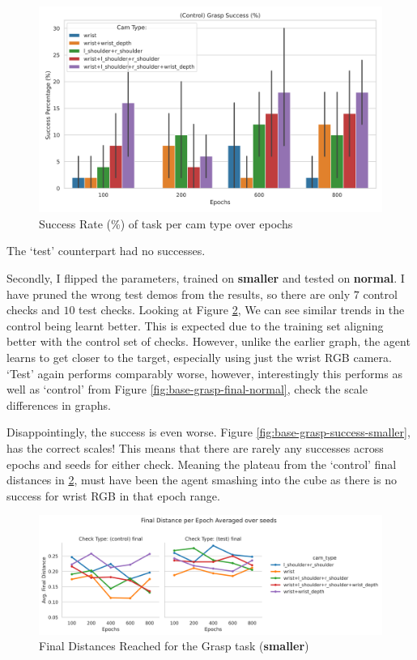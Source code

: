 \begin{figure}[htpb]
  \centering
  \includegraphics[width=0.6\linewidth]{assets/evaluation/baseline/base-grasp-control-success-cams-epochs.png}
  \caption{Success Rate (\%) of task per cam type over epochs}\label{fig:base-grasp-control-success-normal}
\end{figure}
The `test' counterpart had no successes.

Secondly, I flipped the parameters, trained on \textbf{smaller} and tested on \textbf{normal}. I have pruned the wrong test demos from the results, so there are only $7$ control checks and $10$ test checks. Looking at Figure \ref{fig:base-grasp-final-smaller}, We can see similar trends in the control being learnt better. This is expected due to the training set aligning better with the control set of checks. However, unlike the earlier graph, the agent learns to get closer to the target, especially using just the wrist RGB camera. `Test' again performs comparably worse, however, interestingly this performs as well as `control' from Figure \ref{fig:base-grasp-final-normal}, check the scale differences in graphs. 

Disappointingly, the success is even worse. Figure \ref{fig:base-grasp-success-smaller}, has the correct scales! This means that there are rarely any successes across epochs and seeds for either check. Meaning the plateau from the `control' final distances in \ref{fig:base-grasp-final-smaller}, must have been the agent smashing into the cube as there is no success for wrist RGB in that epoch range. 

\begin{figure}[htpb]
  \centering
  \includegraphics[width=\linewidth]{assets/evaluation/baseline/base-grasp-final-smaller.png}
  \caption{Final Distances Reached for the Grasp task (\textbf{smaller})}\label{fig:base-grasp-final-smaller}
\end{figure}

